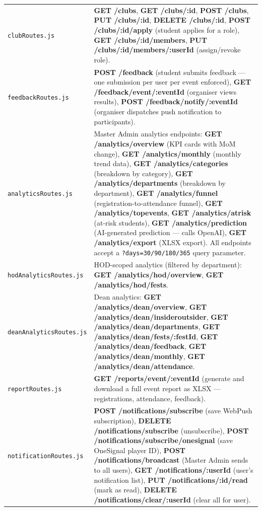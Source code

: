 \documentclass[12pt,a4paper]{article}
\begin{document}
\begin{longtable}{L{5cm} X}
\addlinespace
\texttt{clubRoutes.js} & \textbf{GET /clubs}, \textbf{GET /clubs/:id}, \textbf{POST /clubs}, \textbf{PUT /clubs/:id}, \textbf{DELETE /clubs/:id}, \textbf{POST /clubs/:id/apply} (student applies for a role), \textbf{GET /clubs/:id/members}, \textbf{PUT /clubs/:id/members/:userId} (assign/revoke role). \\
\addlinespace
\texttt{feedbackRoutes.js} & \textbf{POST /feedback} (student submits feedback — one submission per user per event enforced), \textbf{GET /feedback/event/:eventId} (organiser views results), \textbf{POST /feedback/notify/:eventId} (organiser dispatches push notification to participants). \\
\addlinespace
\texttt{analyticsRoutes.js} & Master Admin analytics endpoints: \textbf{GET /analytics/overview} (KPI cards with MoM change), \textbf{GET /analytics/monthly} (monthly trend data), \textbf{GET /analytics/categories} (breakdown by category), \textbf{GET /analytics/departments} (breakdown by department), \textbf{GET /analytics/funnel} (registration-to-attendance funnel), \textbf{GET /analytics/topevents}, \textbf{GET /analytics/atrisk} (at-risk students), \textbf{GET /analytics/prediction} (AI-generated prediction — calls OpenAI), \textbf{GET /analytics/export} (XLSX export). All endpoints accept a \texttt{?days=30/90/180/365} query parameter. \\
\addlinespace
\texttt{hodAnalyticsRoutes.js} & HOD-scoped analytics (filtered by department): \textbf{GET /analytics/hod/overview}, \textbf{GET /analytics/hod/fests}. \\
\addlinespace
\texttt{deanAnalyticsRoutes.js} & Dean analytics: \textbf{GET /analytics/dean/overview}, \textbf{GET /analytics/dean/insideroutsider}, \textbf{GET /analytics/dean/departments}, \textbf{GET /analytics/dean/fests/:festId}, \textbf{GET /analytics/dean/feedback}, \textbf{GET /analytics/dean/monthly}, \textbf{GET /analytics/dean/attendance}. \\
\addlinespace
\texttt{reportRoutes.js} & \textbf{GET /reports/event/:eventId} (generate and download a full event report as XLSX — registrations, attendance, feedback). \\
\addlinespace
\texttt{notificationRoutes.js} & \textbf{POST /notifications/subscribe} (save WebPush subscription), \textbf{DELETE /notifications/subscribe} (unsubscribe), \textbf{POST /notifications/subscribe/onesignal} (save OneSignal player ID), \textbf{POST /notifications/broadcast} (Master Admin sends to all users), \textbf{GET /notifications/:userId} (user's notification list), \textbf{PUT /notifications/:id/read} (mark as read), \textbf{DELETE /notifications/clear/:userId} (clear all for user). \\

\end{longtable}
\end{document}
